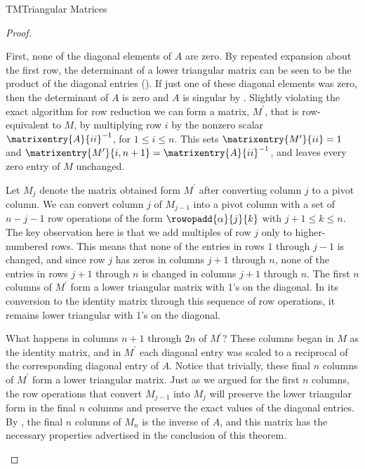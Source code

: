 \begin{subsect}{TM}{Triangular Matrices}
\begin{proof}
\begin{para}First, none of the diagonal elements of $A$ are zero.  By repeated expansion about the first row, the determinant of a lower triangular matrix can be seen to be the product of the diagonal entries ().  If just one of these diagonal elements was zero, then the determinant of $A$ is zero and $A$ is singular by .   Slightly violating the exact algorithm for row reduction we can form a matrix, $M^\prime$, that is row-equivalent to $M$, by multiplying row $i$ by the nonzero scalar $\matrixentry{A}{ii}^{-1}$, for $1\leq i\leq n$.  This sets $\matrixentry{M^\prime}{ii}=1$ and $\matrixentry{M^\prime}{i,n+1}=\matrixentry{A}{ii}^{-1}$, and leaves every zero entry of $M$ unchanged.\end{para}
%
\begin{para}Let $M_j$ denote the matrix obtained form $M^\prime$ after converting column $j$ to a pivot column.  We can convert column $j$ of $M_{j-1}$ into a pivot column with a set of $n-j-1$ row operations of the form $\rowopadd{\alpha}{j}{k}$ with $j+1\leq k\leq n$.  The key observation here is that we add multiples of row $j$ only to higher-numbered rows.  This means that none of the entries in rows $1$ through $j-1$ is changed, and since row $j$ has zeros in columns $j+1$ through $n$, none of the entries in rows $j+1$ through $n$ is changed in columns $j+1$ through $n$.  The first $n$ columns of $M^\prime$ form a lower triangular matrix with 1's on the diagonal.  In its conversion to the identity matrix through this sequence of row operations, it remains lower triangular with 1's on the diagonal.\end{para}
%
\begin{para}What happens in columns $n+1$ through $2n$ of $M^\prime$?  These columns began in $M$ as the identity matrix, and in $M^\prime$ each diagonal entry was scaled to a reciprocal of the corresponding diagonal entry of $A$.  Notice that trivially, these final $n$ columns of $M^\prime$ form a lower triangular matrix.  Just as we argued for the first $n$ columns, the row operations that convert $M_{j-1}$ into $M_j$ will preserve the lower triangular form in the final $n$ columns and preserve the exact values of the diagonal entries.  By , the final $n$ columns of $M_n$ is the inverse of $A$, and this matrix has the necessary properties advertised in the conclusion of this theorem.\end{para}
%
\end{proof}
%
%
\end{subsect}
